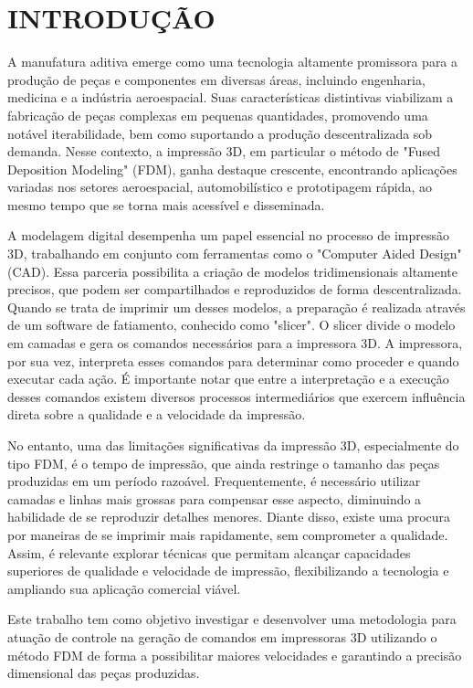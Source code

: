 \chapter{INTRODUÇÃO}
A manufatura aditiva emerge como uma tecnologia altamente promissora para a produção de peças e componentes em diversas áreas, incluindo engenharia, medicina e a indústria aeroespacial. Suas características distintivas viabilizam a fabricação de peças complexas em pequenas quantidades, promovendo uma notável iterabilidade, bem como suportando a produção descentralizada sob demanda. Nesse contexto, a impressão 3D, em particular o método de "Fused Deposition Modeling" (FDM), ganha destaque crescente, encontrando aplicações variadas nos setores aeroespacial, automobilístico e prototipagem rápida, ao mesmo tempo que se torna mais acessível e disseminada.

A modelagem digital desempenha um papel essencial no processo de impressão 3D, trabalhando em conjunto com ferramentas como o "Computer Aided Design" (CAD). Essa parceria possibilita a criação de modelos tridimensionais altamente precisos, que podem ser compartilhados e reproduzidos de forma descentralizada. Quando se trata de imprimir um desses modelos, a preparação é realizada através de um software de fatiamento, conhecido como "slicer". O slicer divide o modelo em camadas e gera os comandos necessários para a impressora 3D. A impressora, por sua vez, interpreta esses comandos para determinar como proceder e quando executar cada ação. É importante notar que entre a interpretação e a execução desses comandos existem diversos processos intermediários que exercem influência direta sobre a qualidade e a velocidade da impressão.

No entanto, uma das limitações significativas da impressão 3D, especialmente do tipo FDM, é o tempo de 
impressão, que ainda restringe o tamanho das peças produzidas em um período razoável. Frequentemente, é 
necessário utilizar camadas e linhas mais grossas para compensar esse aspecto, diminuindo a habilidade de
se reproduzir detalhes menores. Diante disso, existe uma procura por maneiras de se imprimir mais rapidamente, 
sem comprometer a qualidade.
Assim, é relevante explorar técnicas que permitam alcançar capacidades superiores de qualidade e 
velocidade de impressão, flexibilizando a tecnologia e ampliando sua aplicação comercial viável. 

Este trabalho tem como objetivo investigar e desenvolver uma metodologia para atuação de controle na geração de
comandos em impressoras 3D utilizando o método FDM de forma a possibilitar maiores velocidades e garantindo a precisão dimensional das peças produzidas.